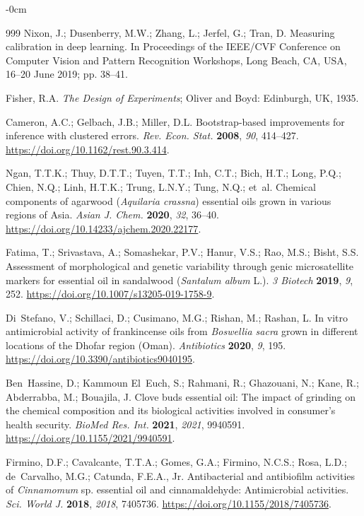 \documentclass[applsci,article,submit,oneauthor]{Definitions/mdpi}
\begin{document}
\begin{adjustwidth}{-\extralength}{0cm}
\begin{thebibliography}{999}
 Nixon, J.; Dusenberry, M.W.; Zhang, L.; Jerfel, G.; Tran, D. Measuring calibration in deep learning. In Proceedings of the IEEE/CVF Conference on Computer Vision and Pattern Recognition Workshops, Long Beach, CA, USA, 16--20 June 2019; pp. 38--41.

 Fisher, R.A. \emph{The Design of Experiments}; Oliver and Boyd: Edinburgh, UK, 1935.

 Cameron, A.C.; Gelbach, J.B.; Miller, D.L. Bootstrap-based improvements for inference with clustered errors. \emph{Rev. Econ. Stat.} \textbf{2008}, \emph{90}, 414--427. \url{https://doi.org/10.1162/rest.90.3.414}.

 Ngan, T.T.K.; Thuy, D.T.T.; Tuyen, T.T.; Inh, C.T.; Bich, H.T.; Long, P.Q.; Chien, N.Q.; Linh, H.T.K.; Trung, L.N.Y.; Tung, N.Q.; et~al. Chemical components of agarwood (\emph{Aquilaria crassna}) essential oils grown in various regions of Asia. \emph{Asian J. Chem.} \textbf{2020}, \emph{32}, 36--40. \url{https://doi.org/10.14233/ajchem.2020.22177}.

 Fatima, T.; Srivastava, A.; Somashekar, P.V.; Hanur, V.S.; Rao, M.S.; Bisht, S.S. Assessment of morphological and genetic variability through genic microsatellite markers for essential oil in sandalwood (\emph{Santalum album} L.). \emph{3 Biotech} \textbf{2019}, \emph{9}, 252. \url{https://doi.org/10.1007/s13205-019-1758-9}.

 Di~Stefano, V.; Schillaci, D.; Cusimano, M.G.; Rishan, M.; Rashan, L. In vitro antimicrobial activity of frankincense oils from \emph{Boswellia sacra} grown in different locations of the Dhofar region (Oman). \emph{Antibiotics} \textbf{2020}, \emph{9}, 195. \url{https://doi.org/10.3390/antibiotics9040195}.

 Ben~Hassine, D.; Kammoun El~Euch, S.; Rahmani, R.; Ghazouani, N.; Kane, R.; Abderrabba, M.; Bouajila, J. Clove buds essential oil: The impact of grinding on the chemical composition and its biological activities involved in consumer's health security. \emph{BioMed Res. Int.} \textbf{2021}, \emph{2021}, 9940591. \url{https://doi.org/10.1155/2021/9940591}.

 Firmino, D.F.; Cavalcante, T.T.A.; Gomes, G.A.; Firmino, N.C.S.; Rosa, L.D.; de~Carvalho, M.G.; Catunda, F.E.A., Jr. Antibacterial and antibiofilm activities of \emph{Cinnamomum} sp. essential oil and cinnamaldehyde: Antimicrobial activities. \emph{Sci. World J.} \textbf{2018}, \emph{2018}, 7405736. \url{https://doi.org/10.1155/2018/7405736}.


\end{thebibliography}
\end{adjustwidth}
\end{document}
